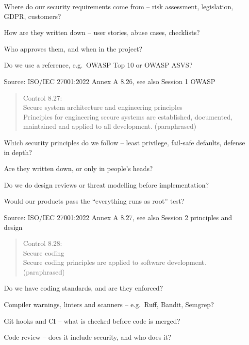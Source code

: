\documentclass[Screen16to9,17pt]{foils}
\begin{document}
\begin{list1}
\item Where do our security requirements come from -- risk assessment, legislation, GDPR, customers?
\item How are they written down -- user stories, abuse cases, checklists?
\item Who approves them, and when in the project?
\item Do we use a reference, e.g.\ OWASP Top 10 or OWASP ASVS?
\end{list1}

Source: ISO/IEC 27001:2022 Annex A 8.26, see also Session 1 OWASP


\begin{quote}
Control 8.27:\\
Secure system architecture and engineering principles\\
Principles for engineering secure systems are established, documented, maintained and applied to all development. (paraphrased)
\end{quote}

\begin{list1}
\item Which security principles do we follow -- least privilege, fail-safe defaults, defense in depth?
\item Are they written down, or only in people's heads?
\item Do we do design reviews or threat modelling before implementation?
\item Would our products pass the ``everything runs as root'' test?
\end{list1}

Source: ISO/IEC 27001:2022 Annex A 8.27, see also Session 2 principles and design


\begin{quote}
Control 8.28:\\
Secure coding\\
Secure coding principles are applied to software development. (paraphrased)
\end{quote}

\begin{list1}
\item Do we have coding standards, and are they enforced?
\item Compiler warnings, linters and scanners -- e.g.\ Ruff, Bandit, Semgrep?
\item Git hooks and CI -- what is checked before code is merged?
\item Code review -- does it include security, and who does it?
\end{list1}
\end{document}
